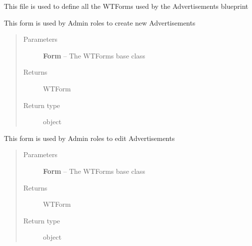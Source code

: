 \documentclass[letterpaper,10pt,english]{sphinxmanual}
\begin{document}
This file is used to define all the WTForms used by the Advertisements blueprint

\begin{fulllineitems}
\label{dev-advertisements:cagenix.advertisements.forms.AdvertisementCreateForm}
This form is used by Admin roles to create new Advertisements
\begin{quote}\begin{description}
\item[{Parameters}] \leavevmode
\textbf{Form} -- The WTForms base class

\item[{Returns}] \leavevmode
WTForm

\item[{Return type}] \leavevmode
object

\end{description}\end{quote}

\end{fulllineitems}


\begin{fulllineitems}
\label{dev-advertisements:cagenix.advertisements.forms.AdvertisementEditForm}
This form is used by Admin roles to edit Advertisements
\begin{quote}\begin{description}
\item[{Parameters}] \leavevmode
\textbf{Form} -- The WTForms base class

\item[{Returns}] \leavevmode
WTForm

\item[{Return type}] \leavevmode
object

\end{description}\end{quote}

\end{fulllineitems}
\end{document}
